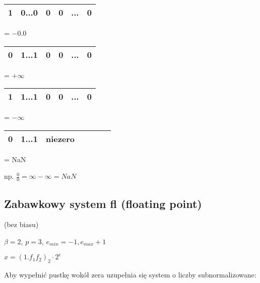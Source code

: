 \documentclass[hidelinks,a4paper]{article}
\begin{document}
\begin{tabular}{|c|c|l|l|l|c|c|c|l|c|}
	\hline
	1 & \multicolumn{4}{c|}{0...0} & 0 & 0 & \multicolumn{2}{c|}{...} & 0 \\ \hline
\end{tabular} = $-0.0$

\begin{tabular}{|c|c|l|l|l|c|c|c|l|c|}
	\hline
	0 & \multicolumn{4}{c|}{1...1} & 0 & 0 & \multicolumn{2}{c|}{...} & 0 \\ \hline
\end{tabular} = $+\infty$

\begin{tabular}{|c|c|l|l|l|c|c|c|l|c|}
	\hline
	1 & \multicolumn{4}{c|}{1...1} & 0 & 0 & \multicolumn{2}{c|}{...} & 0 \\ \hline
\end{tabular} = $-\infty$

\begin{tabular}{|c|c|l|l|l|c|c|c|l|c|}
	\hline
	0 & \multicolumn{4}{c|}{1...1} & niezero \\ \hline
\end{tabular} = NaN

np. $\frac{0}{0} = \infty - \infty = NaN$

\subsection{Zabawkowy system fl (floating point)}

(bez biasu)

$\beta = 2$, $p = 3$, $e_{min} = -1, e_{max} + 1$

$x = (1.f_1f_2)_2 \cdot 2^{e}$



Aby wypełnić pustkę wokół zera uzupełnia się system o liczby subnormalizowane:
\end{document}
